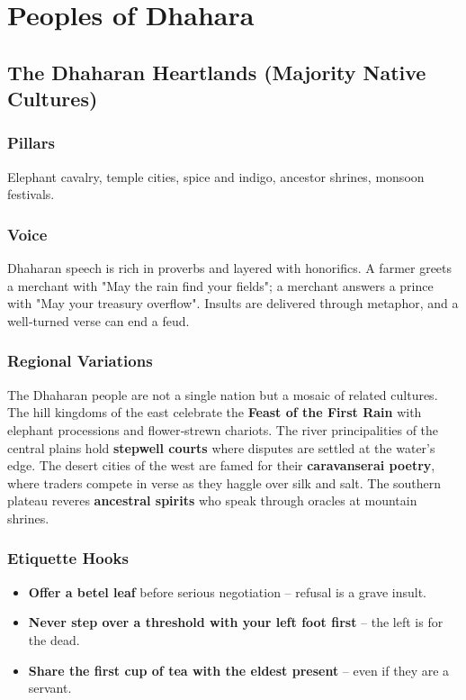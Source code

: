\documentclass[11pt]{book}
\begin{document}
\clearpage
\chapter{Peoples of Dhahara}

\section{The Dhaharan Heartlands (Majority Native Cultures)}

\subsection*{Pillars}
Elephant cavalry, temple cities, spice and indigo, ancestor shrines, monsoon festivals.

\subsection*{Voice}
Dhaharan speech is rich in proverbs and layered with honorifics. A farmer greets a merchant with "May the rain find your fields"; a merchant answers a prince with "May your treasury overflow". Insults are delivered through metaphor, and a well‑turned verse can end a feud.

\subsection*{Regional Variations}
The Dhaharan people are not a single nation but a mosaic of related cultures. The hill kingdoms of the east celebrate the \textbf{Feast of the First Rain} with elephant processions and flower‑strewn chariots. The river principalities of the central plains hold \textbf{stepwell courts} where disputes are settled at the water's edge. The desert cities of the west are famed for their \textbf{caravanserai poetry}, where traders compete in verse as they haggle over silk and salt. The southern plateau reveres \textbf{ancestral spirits} who speak through oracles at mountain shrines.

\subsection*{Etiquette Hooks}
\begin{itemize}
    \item \textbf{Offer a betel leaf} before serious negotiation -- refusal is a grave insult.
    \item \textbf{Never step over a threshold with your left foot first} -- the left is for the dead.
    \item \textbf{Share the first cup of tea with the eldest present} -- even if they are a servant.
\end{itemize}
\end{document}
